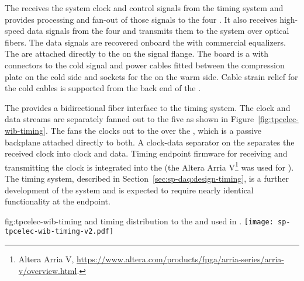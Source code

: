 The  %
receives the system clock and control signals from the
timing system and provides processing and fan-out of those signals to the four
. 
It also receives high-speed data signals from the four 
 and transmits them to the  system over optical
fibers. The data signals are recovered onboard the  with commercial 
equalizers. The  are attached directly to the 
 \fdth on the signal flange. The \fdth board is a  
with connectors to the cold signal and  power cables fitted
between the compression plate on the cold side and sockets for
the  on the warm side. Cable strain relief for the cold cables is 
supported  from the back end of the \fdth.

The   provides a bidirectional fiber interface to the
timing system. The clock and data streams are separately fanned out to the 
five  as shown in Figure~\ref{fig:tpcelec-wib-timing}. The 
 fans the clocks out to the  over the , which is a 
passive backplane attached directly to both. %
A clock-data separator on the  separates the received clock into clock and data.  
Timing endpoint firmware for receiving and transmitting %
the clock is integrated into the   (the Altera 
Arria V\footnote{Altera Arria\texttrademark{} V, \url{https://www.altera.com/products/fpga/arria-series/arria-v/overview.html}.} was used for ). 
The  timing system, described in Section~\ref{sec:sp-daq:design-timing}, 
is a further development of the  system and is expected to require nearly identical 
functionality  at the  endpoint.

\begin{dunefigure}
{fig:tpcelec-wib-timing}
{ and timing distribution to the  and  used in .}
\texttt{[image: sp-tpcelec-wib-timing-v2.pdf]}
\end{dunefigure}

